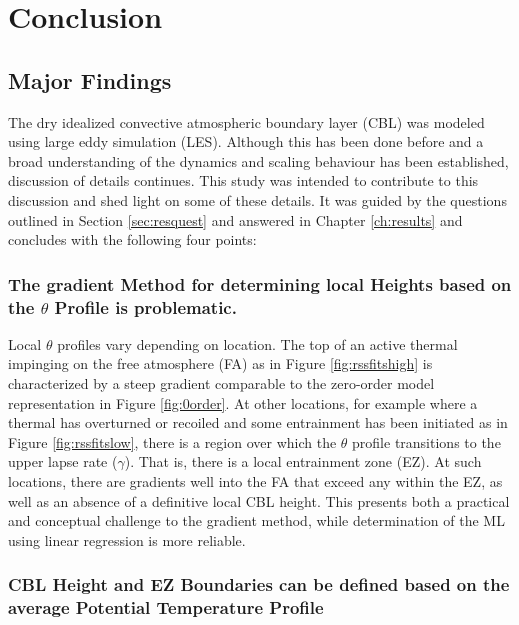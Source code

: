 
\chapter{Conclusion}
\label{ch:conc}
\setlength{\parindent}{0cm}

\section{Major Findings}

The dry idealized convective atmospheric boundary layer (\acs{CBL}) was modeled using large eddy simulation (\acs{LES}).  Although this has been done before and a broad understanding of the dynamics and scaling behaviour has been established, discussion of details continues.  This study was intended to contribute to this discussion and shed light on some of these details.  It was guided by the questions outlined in Section \ref{sec:resquest} and answered in Chapter \ref{ch:results} and concludes with the following four points:    


\subsection{The gradient Method for determining local Heights based on the $\theta$ Profile is problematic.}

Local $\theta$ profiles vary depending on location.  The top of an active thermal impinging on the free atmosphere (\acs{FA}) as in Figure \ref{fig:rssfitshigh} is characterized by a steep gradient comparable to the zero-order model representation in Figure \ref{fig:0order}.  At other locations, for example where a thermal has overturned or recoiled and some entrainment has been initiated as in Figure \ref{fig:rssfitslow}, there is a region over which the $\theta$ profile transitions to the upper lapse rate ($\gamma$). That is, there is a local entrainment zone (\acs{EZ}).  At such locations, there are gradients well into the \acs{FA} that exceed any within the \acs{EZ}, as well as an absence of a definitive local \acs{CBL} height.  This presents both a practical and conceptual challenge to the gradient method, while determination of the \acs{ML} using linear regression is more reliable. 

\subsection{\acs{CBL} Height and \acs{EZ} Boundaries can be defined based on the average Potential Temperature Profile}

